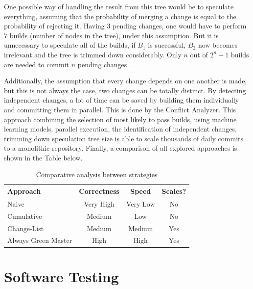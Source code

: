 One possible way of handling the result from this tree would be to speculate everything, assuming that the probability of merging a change is equal to the probability of rejecting it. Having 3 pending changes, one would have to perform 7 builds (number of nodes in the tree), under this assumption. But it is unnecessary to speculate all of the builds, if $B_1$ is successful, $B_2$ now becomes irrelevant and the tree is trimmed down considerably. Only $n$ out of $2^n - 1$ builds are needed to commit $n$ pending changes \cite{Uber}. \par
Additionally, the assumption that every change depends on one another is made, but this is not always the case, two changes can be totally distinct. By detecting independent changes,  a lot of time can be saved by building them individually and committing them in parallel. This is done by the Conflict Analyzer. This approach combining the selection of most likely to pass builds, using machine learning models, parallel execution, the identification of independent changes, trimming down speculation tree size is able to scale thousands of daily commits to a monolithic repository. Finally, a comparison of all explored approaches is shown in the Table below.


\begin{table}[b]
\begin{tabular}{lccc}
	\hline
	\textbf{Approach} & \multicolumn{1}{l}{\textbf{Correctness}} & \textbf{Speed}    & \multicolumn{1}{l}{ \textbf{Scales?}} \\ \hline
	Naive                & Very High                       & Very Low & No                                   \\
	Cumulative           & Medium                          & Low      & No                                   \\
	Change-List          & Medium                            & Medium     & Yes                                  \\
	Always Green Master  & High                            & High     & Yes                                  \\ \hline
\end{tabular}
\caption{Comparative analysis between strategies}
\end{table}




\section{Software Testing}

